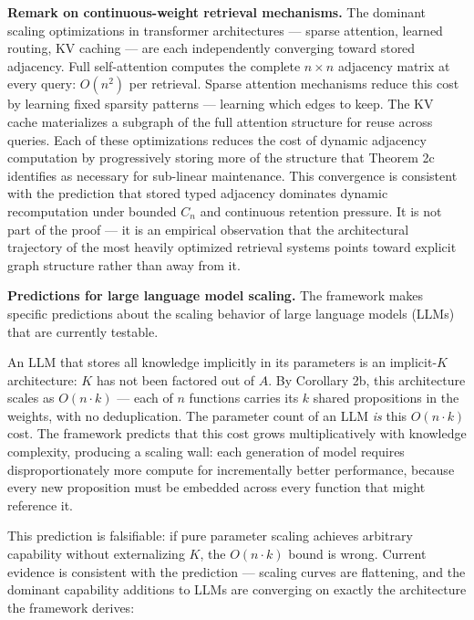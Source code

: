 \documentclass[
]{article}
\begin{document}
\textbf{Remark on continuous-weight retrieval mechanisms.} The dominant
scaling optimizations in transformer architectures --- sparse attention,
learned routing, KV caching --- are each independently converging toward
stored adjacency. Full self-attention computes the complete
\(n \times n\) adjacency matrix at every query: \(O(n^2)\) per
retrieval. Sparse attention mechanisms reduce this cost by learning
fixed sparsity patterns --- learning which edges to keep. The KV cache
materializes a subgraph of the full attention structure for reuse across
queries. Each of these optimizations reduces the cost of dynamic
adjacency computation by progressively storing more of the structure
that Theorem 2c identifies as necessary for sub-linear maintenance.
This convergence is consistent with the prediction that stored typed
adjacency dominates dynamic recomputation under bounded \(C_n\) and
continuous retention pressure. It is not part of the proof --- it is
an empirical observation that the architectural trajectory of the most
heavily optimized retrieval systems points toward explicit graph
structure rather than away from it.

\textbf{Predictions for large language model scaling.} The framework
makes specific predictions about the scaling behavior of large language
models (LLMs) that are currently testable.

An LLM that stores all knowledge implicitly in its parameters is an
implicit-\(K\) architecture: \(K\) has not been factored out of \(A\).
By Corollary 2b, this architecture scales as \(O(n \cdot k)\) --- each
of \(n\) functions carries its \(k\) shared propositions in the weights,
with no deduplication. The parameter count of an LLM \emph{is} this
\(O(n \cdot k)\) cost. The framework predicts that this cost grows
multiplicatively with knowledge complexity, producing a scaling wall:
each generation of model requires disproportionately more compute for
incrementally better performance, because every new proposition must be
embedded across every function that might reference it.

This prediction is falsifiable: if pure parameter scaling achieves
arbitrary capability without externalizing \(K\), the \(O(n \cdot k)\)
bound is wrong. Current evidence is consistent with the prediction ---
scaling curves are flattening, and the dominant capability additions to
LLMs are converging on exactly the architecture the framework derives:
\end{document}
